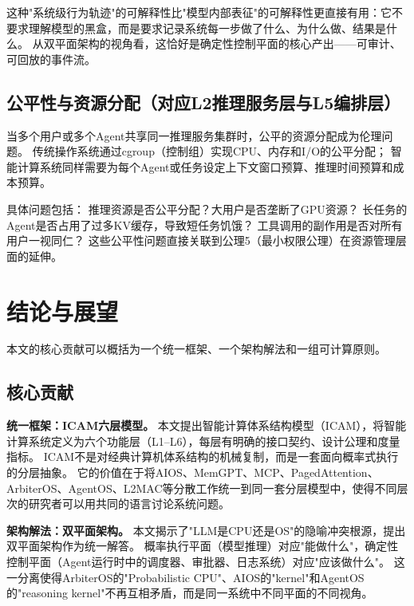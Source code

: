 这种"系统级行为轨迹"的可解释性比"模型内部表征"的可解释性更直接有用：它不要求理解模型的黑盒，而是要求记录系统每一步做了什么、为什么做、结果是什么。
从双平面架构的视角看，这恰好是确定性控制平面的核心产出——可审计、可回放的事件流。

\subsection{公平性与资源分配（对应L2推理服务层与L5编排层）}

当多个用户或多个Agent共享同一推理服务集群时，公平的资源分配成为伦理问题。
传统操作系统通过cgroup（控制组）实现CPU、内存和I/O的公平分配\cite{linux_cgroup_2026}；
智能计算系统同样需要为每个Agent或任务设定上下文窗口预算、推理时间预算和成本预算。

具体问题包括：
推理资源是否公平分配？大用户是否垄断了GPU资源？
长任务的Agent是否占用了过多KV缓存，导致短任务饥饿？
工具调用的副作用是否对所有用户一视同仁？
这些公平性问题直接关联到公理5（最小权限公理）在资源管理层面的延伸。

\section{结论与展望}
\label{sec:conclusion}

本文的核心贡献可以概括为一个统一框架、一个架构解法和一组可计算原则。

\subsection{核心贡献}

\textbf{统一框架：ICAM六层模型。}
本文提出智能计算体系结构模型（ICAM），将智能计算系统定义为六个功能层（L1--L6），每层有明确的接口契约、设计公理和度量指标。
ICAM不是对经典计算机体系结构的机械复制，而是一套面向概率式执行的分层抽象。
它的价值在于将AIOS\cite{mei2024aios}、MemGPT\cite{memgpt2023}、MCP\cite{mcp_intro_2026}、PagedAttention\cite{kwon2023pagedattention}、ArbiterOS\cite{arbiteros2025}、AgentOS\cite{agentos2025}、L2MAC\cite{holt2024l2mac}等分散工作统一到同一套分层模型中，使得不同层次的研究者可以用共同的语言讨论系统问题。

\textbf{架构解法：双平面架构。}
本文揭示了"LLM是CPU还是OS"的隐喻冲突根源，提出双平面架构作为统一解答。
概率执行平面（模型推理）对应"能做什么"，确定性控制平面（Agent运行时中的调度器、审批器、日志系统）对应"应该做什么"。
这一分离使得ArbiterOS的"Probabilistic CPU"\cite{arbiteros2025}、AIOS的"kernel"\cite{mei2024aios}和AgentOS的"reasoning kernel"\cite{agentos2025}不再互相矛盾，而是同一系统中不同平面的不同视角。

